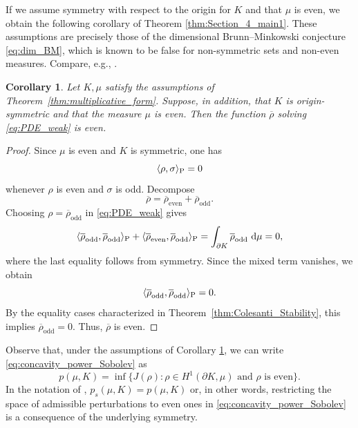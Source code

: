 \documentclass[a4paper, 11pt]{article}
\newtheorem{corollary}[theorem]{Corollary}
\theoremstyle{definition}
\newcommand{\di}{\, \mathrm{d}}
\begin{document}
\medskip

If we assume symmetry with respect to the origin for $K$ and that $\mu$ is even, we obtain the following corollary of Theorem \ref{thm:Section_4_main1}. These assumptions are precisely those of the dimensional Brunn--Minkowski conjecture \eqref{eq:dim_BM}, which is known to be false for non-symmetric sets and non-even measures. Compare, e.g., \cite{nayar2013note}.
\begin{corollary}\label{cor:even}
Let $K,\mu$ satisfy the assumptions of Theorem~\ref{thm:multiplicative_form}. Suppose, in addition, that $K$ is origin-symmetric and that the measure $\mu$ is even. Then the function $\overline{\rho}$ solving \eqref{eq:PDE_weak} is even.
\end{corollary}
\begin{proof}
Since $\mu$ is even and $K$ is symmetric, one has
\[\langle \rho, \sigma \rangle_{\rm P} = 0\]
whenever $\rho$ is even and $\sigma$ is odd. Decompose
\[\overline{\rho} = \overline{\rho}_{\mathrm{even}} + \overline{\rho}_{\mathrm{odd}}.\]
Choosing $\rho=\overline{\rho}_{\mathrm{odd}}$ in \eqref{eq:PDE_weak} gives
\[\langle \overline{\rho}_{\mathrm{odd}},\overline{\rho}_{\mathrm{odd}} \rangle_{\rm P}+\langle\overline{\rho}_{\mathrm{even}},\overline{\rho}_{\mathrm{odd}} \rangle_{\rm P}=\int_{\partial K} \overline{\rho}_{\mathrm{odd}}\,\di\mu=0,\]
where the last equality follows from symmetry. Since the mixed term vanishes, we obtain
\[\langle \overline{\rho}_{\mathrm{odd}},\overline{\rho}_{\mathrm{odd}} \rangle_{\rm P}=0.\]
By the equality cases characterized in Theorem~\ref{thm:Colesanti_Stability}, this implies $\overline{\rho}_{\mathrm{odd}}=0$. Thus, $\overline{\rho}$ is even.
\end{proof}\noindent
Observe that, under the assumptions of Corollary \ref{cor:even}, we can write \eqref{eq:concavity_power_Sobolev} as \[ p(\mu,K)=\inf \{ J(\rho): \rho \in H^{1}(\partial K,\mu) \text{ and }\rho \text{ is even} \}.\] In the notation of \cite{GalynaStability}, $p_s(\mu,K)=p(\mu,K)$ or, in other words, restricting the space of admissible perturbations to even ones in \eqref{eq:concavity_power_Sobolev} is a consequence of the underlying symmetry. 

\medskip
\end{document}
